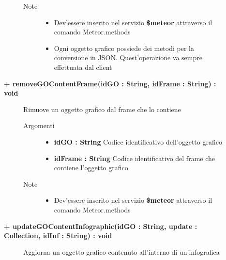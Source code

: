 \begin{description}
\begin{description}
\begin{description}
\begin{itemize}
					
				\end{itemize}
			\item[Note] \hfill
			\begin{itemize}
					\item Dev'essere inserito nel servizio \textbf{\$meteor} attraverso il comando Meteor.methods
					\item Ogni oggetto grafico possiede dei metodi per la conversione in JSON. Quest'operazione va sempre effettuata dal client
				\end{itemize}
		\end{description}
	\end{description}
	
	\begin{description}
		\item[\textbf{\color{blue}+ removeGOContentFrame(idGO : String, idFrame : String) : void			}] \hfill
			Rimuove un oggetto grafico dal frame che lo contiene
			
		\begin{description}
			\item[Argomenti] \hfill
				\begin{itemize}
				
					\item \textbf{idGO : String		} \hfill
					Codice identificativo dell'oggetto grafico
					\item \textbf{idFrame : String		} \hfill
					Codice identificativo del frame che contiene l'oggetto grafico
					
				\end{itemize}
			\item[Note] \hfill
			\begin{itemize}
					\item Dev'essere inserito nel servizio \textbf{\$meteor} attraverso il comando Meteor.methods
				\end{itemize}
		\end{description}
	\end{description}
	
	\begin{description}
		\item[\textbf{\color{blue}+ updateGOContentInfographic(idGO : String, update : Collection, idInf : String) : void			}] \hfill
			Aggiorna un oggetto grafico contenuto all'interno di un'infografica
			

\end{description}
\end{description}
